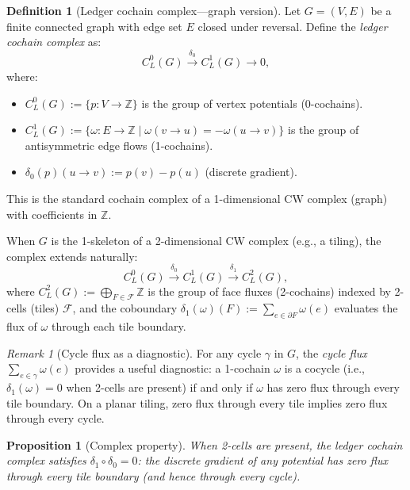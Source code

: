 \documentclass[12pt]{article}
\newtheorem{proposition}[theorem]{Proposition}
\theoremstyle{definition}
\newtheorem{definition}[theorem]{Definition}
\theoremstyle{remark}
\newtheorem{remark}[theorem]{Remark}
\newcommand{\ZZ}{\mathbb{Z}}
\begin{document}
\begin{definition}[Ledger cochain complex---graph version]
\label{def:ledger-complex}
Let $G = (V, E)$ be a finite connected graph with edge set $E$ closed under reversal. Define the \emph{ledger cochain complex} as:
\begin{equation}
C^0_L(G) \xrightarrow{\;\delta_0\;} C^1_L(G) \xrightarrow{\quad} 0,
\label{eq:ledger-complex}
\end{equation}
where:
\begin{itemize}
\item $C^0_L(G) := \{p: V \to \ZZ\}$ is the group of vertex potentials (0-cochains).
\item $C^1_L(G) := \{\omega: E \to \ZZ \mid \omega(v \to u) = -\omega(u \to v)\}$ is the group of antisymmetric edge flows (1-cochains).
\item $\delta_0(p)(u \to v) := p(v) - p(u)$ (discrete gradient).
\end{itemize}
This is the standard cochain complex of a 1-dimensional CW complex (graph) with coefficients in $\ZZ$.
\end{definition}

When $G$ is the 1-skeleton of a 2-dimensional CW complex (e.g., a tiling), the complex extends naturally:
\begin{equation}
C^0_L(G) \xrightarrow{\;\delta_0\;} C^1_L(G) \xrightarrow{\;\delta_1\;} C^2_L(G),
\label{eq:ledger-complex-2d}
\end{equation}
where $C^2_L(G) := \bigoplus_{F \in \mathcal{F}} \ZZ$ is the group of face fluxes (2-cochains) indexed by 2-cells (tiles) $\mathcal{F}$, and the coboundary $\delta_1(\omega)(F) := \sum_{e \in \partial F} \omega(e)$ evaluates the flux of $\omega$ through each tile boundary.

\begin{remark}[Cycle flux as a diagnostic]
For any cycle $\gamma$ in $G$, the \emph{cycle flux} $\sum_{e \in \gamma} \omega(e)$ provides a useful diagnostic: a 1-cochain $\omega$ is a cocycle (i.e., $\delta_1(\omega) = 0$ when 2-cells are present) if and only if $\omega$ has zero flux through every tile boundary. On a planar tiling, zero flux through every tile implies zero flux through every cycle.
\end{remark}

\begin{proposition}[Complex property]
\label{prop:ledger-exact}
When 2-cells are present, the ledger cochain complex satisfies $\delta_1 \circ \delta_0 = 0$: the discrete gradient of any potential has zero flux through every tile boundary (and hence through every cycle).
\end{proposition}
\end{document}
